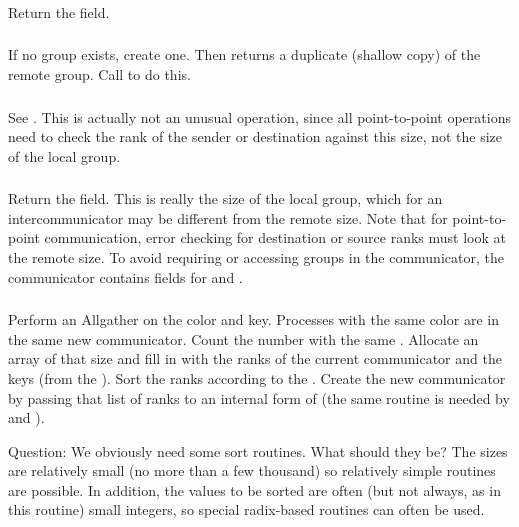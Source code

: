 \documentclass{article}
\begin{document}
\subsubsection{}
Return the  field.

\subsubsection{}
If no group exists, create one.  Then
returns a duplicate (shallow copy) of the remote group.  Call
 to do this.

\subsubsection{}
See .  This is actually not an unusual operation,
since all point-to-point operations need to check the rank of the
sender or destination against this size, not the size of the local
group.  

\subsubsection{}
Return the  field.  This is really the size of the local
group, which for an intercommunicator may be different from the remote
size.  Note that for point-to-point communication, error checking for
destination or source ranks must look at the remote size.  To avoid
requiring or accessing groups in the communicator, the communicator
contains fields for  and
. 

\subsubsection{}
Perform an Allgather on the color and key.  Processes with the same color are
in the same new communicator.  Count the number with the same
.  Allocate an array of that size and fill in with the
ranks of the current communicator and the keys (from the
).  Sort the ranks according to the .
Create the new communicator by passing that list of ranks to an
internal form of  (the same routine is needed
by  and ). 

Question: We obviously need some sort routines.  What should they be?
The sizes are relatively small (no more than a few thousand) so
relatively simple routines are possible.  In addition, the values to
be sorted are often (but not always, as in this routine) small
integers, so special radix-based routines can often be used.
\end{document}
